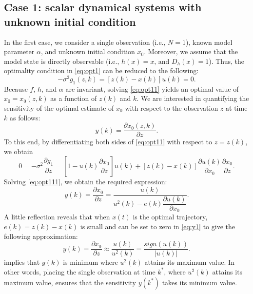 \documentclass{article}
\begin{document}
\subsection{Case 1: scalar dynamical systems with unknown initial condition}
In the first case, we consider a single observation (i.e., $N = 1$), known model parameter $\alpha$, and unknown initial condition $x_0$. Moreover, we assume that the model state is directly observable (i.e., $h(x)=x$, and $D_h(x) = 1$). Thus, the optimality condition in \cref{eq:opt1} can be reduced to the following:
\begin{equation}
    -\sigma^2 g_1(z,k) = [z(k)-x(k)]u(k) = 0. \label{eq:opt11}
\end{equation}
Because $f$, $h$, and $\alpha$ are invariant, solving \cref{eq:opt11} yields an optimal value of $x_0 = x_0(z, k)$ as a function of $z(k)$ and $k$. We are interested in quantifying the sensitivity of the optimal estimate of $x_0$ with respect to the observation $z$ at time $k$ as follows:
\begin{equation}
    y(k) = \dfrac{\partial x_0(z,k)}{\partial z}.
\end{equation}
To this end, by differentiating both sides of \cref{eq:opt11} with respect to $z = z(k)$, we obtain
\begin{equation}
    0 = -\sigma^2 \dfrac{\partial g_1}{\partial z} = [1-u(k)\dfrac{\partial x_0}{\partial z}] u(k) + [z(k) - x(k)]\dfrac{\partial u(k)}{\partial x_0} \dfrac{\partial x_0}{\partial z}. \label{eq:opt111}
\end{equation}
Solving \cref{eq:opt111}, we obtain the required expression:
\begin{equation}
    y(k) = \dfrac{\partial x_0}{\partial z} = \dfrac{u(k)}{u^2(k) - e(k) \dfrac{\partial u(k)}{\partial x_0}}. \label{eq:y1}
\end{equation}
A little reflection reveals that when $x(t)$ is the optimal trajectory, $e(k)=z(k)-x(k)$ is small and can be set to zero in \cref{eq:y1} to give the following approximation:
\begin{equation}
    y(k) = \dfrac{\partial x_0}{\partial z} \approx \dfrac{u(k)}{u^2(k)} = \dfrac{sign(u(k))}{|u(k)|}. \label{eq:y11}
\end{equation}
 implies that $y(k)$ is minimum where $u^2(k)$ attains its maximum value. In other words, placing the single observation at time $k^*$, where $u^2(k)$ attains its maximum value, ensures that the sensitivity $y(k^*)$ takes its minimum value. 
\end{document}
